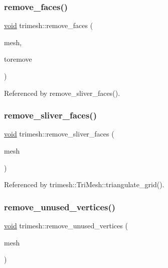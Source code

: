 \subsubsection{\texorpdfstring{remove\+\_\+faces()}{remove\_faces()}\hspace{0.1cm}{\footnotesize\ttfamily [2/2]}}
{\footnotesize\ttfamily \hyperlink{namespacetrimesh_a784ddfd979e1c579bda795a8edfc3f43}{void} trimesh\+::remove\+\_\+faces (\begin{DoxyParamCaption}\item[{\hyperlink{classtrimesh_1_1TriMesh}{Tri\+Mesh} $\ast$}]{mesh,  }\item[{const vector$<$ bool $>$ \&}]{toremove }\end{DoxyParamCaption})}



Referenced by remove\+\_\+sliver\+\_\+faces().

\mbox{\label{namespacetrimesh_afe82003e1666436750d8920cc5f8aa1c}} 
\subsubsection{\texorpdfstring{remove\+\_\+sliver\+\_\+faces()}{remove\_sliver\_faces()}}
{\footnotesize\ttfamily \hyperlink{namespacetrimesh_a784ddfd979e1c579bda795a8edfc3f43}{void} trimesh\+::remove\+\_\+sliver\+\_\+faces (\begin{DoxyParamCaption}\item[{\hyperlink{classtrimesh_1_1TriMesh}{Tri\+Mesh} $\ast$}]{mesh }\end{DoxyParamCaption})}



Referenced by trimesh\+::\+Tri\+Mesh\+::triangulate\+\_\+grid().

\mbox{\label{namespacetrimesh_a0930a3eeaa4d0e80fbccb6b1baf71525}} 
\subsubsection{\texorpdfstring{remove\+\_\+unused\+\_\+vertices()}{remove\_unused\_vertices()}}
{\footnotesize\ttfamily \hyperlink{namespacetrimesh_a784ddfd979e1c579bda795a8edfc3f43}{void} trimesh\+::remove\+\_\+unused\+\_\+vertices (\begin{DoxyParamCaption}\item[{\hyperlink{classtrimesh_1_1TriMesh}{Tri\+Mesh} $\ast$}]{mesh }\end{DoxyParamCaption})}



